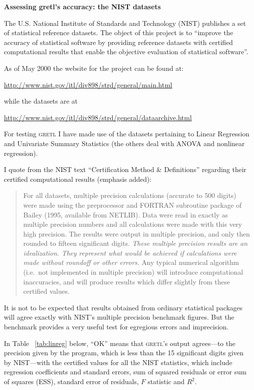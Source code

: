\documentclass{article}
\begin{document}
\begin{center}
  {\large \textbf{Assessing gretl's accuracy: the NIST datasets}}
\end{center}

The U.S. National Institute of Standards and Technology (NIST)
publishes a set of statistical reference datasets.  The object
of this project is to ``improve the accuracy of statistical software
by providing reference datasets with certified computational results
that enable the objective evaluation of statistical software''.

As of May 2000 the website for the project can be found at:

\url{http://www.nist.gov/itl/div898/strd/general/main.html}

\noindent while the datasets are at

\url{http://www.nist.gov/itl/div898/strd/general/dataarchive.html}

For testing \textsc{gretl} I have made use of the datasets pertaining
to Linear Regression and Univariate Summary Statistics (the others
deal with ANOVA and nonlinear regression).

I quote from the NIST text ``Certification Method \& Definitions''
regarding their certified computational results (emphasis added):

\begin{quote}
  For all datasets, multiple precision calculations (accurate to 500
  digits) were made using the preprocessor and FORTRAN subroutine
  package of Bailey (1995, available from NETLIB). Data were read in
  exactly as multiple precision numbers and all calculations were made
  with this very high precision. The results were output in multiple
  precision, and only then rounded to fifteen significant digits.
  \textit{These multiple precision results are an idealization. They
    represent what would be achieved if calculations were made without
    roundoff or other errors.} Any typical numerical algorithm (i.e.\ 
  not implemented in multiple precision) will introduce computational
  inaccuracies, and will produce results which differ slightly from
  these certified values.
\end{quote}

It is not to be expected that results obtained from ordinary
statistical packages will agree exactly with NIST's multiple precision
benchmark figures.  But the benchmark provides a very useful test for
egregious errors and imprecision.  

In Table ~\ref{tab:linreg} below, ``OK'' means that \textsc{gretl}'s
output agrees---to the precision given by the program, which is less
than the 15 significant digits given by NIST---with the certified
values for all the NIST statistics, which include regression
coefficients and standard errors, sum of squared residuals or error
sum of squares (ESS), standard error of residuals, $F$ statistic and
$R^2$.
\end{document}
